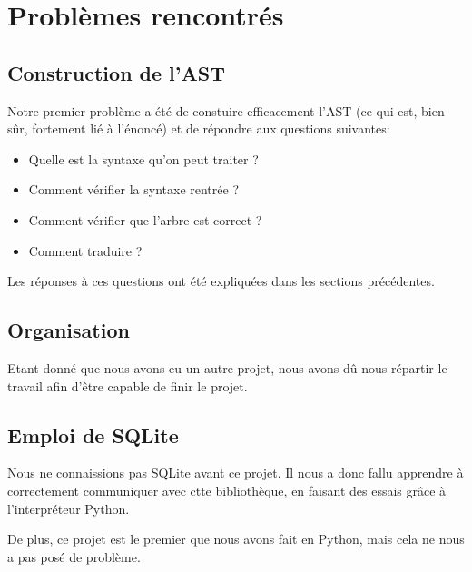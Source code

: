 \documentclass[]{article}
\begin{document}
\section{Probl\`emes rencontr\'es}
\subsection{Construction de l'AST}
Notre premier probl\`eme a \'et\'e de constuire efficacement l'AST (ce qui est, bien s\^ur, fortement li\'e \`a l'\'enonc\'e) et de r\'epondre aux questions suivantes:
\begin{itemize}
	\item Quelle est la syntaxe qu'on peut traiter ?
	\item Comment v\'erifier la syntaxe rentr\'ee ?
	\item Comment v\'erifier que l'arbre est correct ?
	\item Comment traduire ?
\end{itemize}

Les r\'eponses \`a ces questions ont \'et\'e expliqu\'ees dans les sections pr\'ec\'edentes.

\subsection{Organisation}
Etant donn\'e que nous avons eu un autre projet, nous avons d\^u nous r\'epartir le travail afin d'\^etre capable de finir le projet.

\subsection{Emploi de SQLite}
Nous ne connaissions pas SQLite avant ce projet. Il nous a donc fallu apprendre \`a correctement communiquer avec ctte biblioth\`eque, en faisant des essais grâce \`a l'interpr\'eteur Python.

De plus, ce projet est le premier que nous avons fait en Python, mais cela ne nous a pas pos\'e de probl\`eme.
\end{document}
